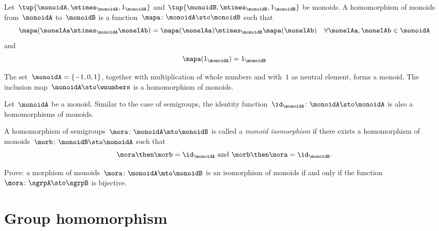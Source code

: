 \begin{definition}
  \label{def:monoid-mor}
  Let~$\tup{\monoidA, \mtimes_\monoidA, 1_\monoidA}$ and $\tup{\monoidB, \mtimes_\monoidB, 1_\monoidB}$ be monoids.
  A homomorphism of monoids from~$\monoidA$ to~$\monoidB$ is a function~$\mapa \colon \monoidA \sto \monoidB$ such that
  \begin{equation}
    \label{mon-mor-comp}
    \mapa (\monelAa \mtimes_{\monoidA} \monelAb) = \mapa (\monelAa) \mtimes_{\monoidB}  \mapa(\monelAb) \quad \forall \monelAa, \monelAb \in \monoidA
  \end{equation}
  and
  \begin{equation}
    \label{mon-id-comp}
    \mapa (1_\monoidA) = 1_{\monoidB}
  \end{equation}
\end{definition}

\begin{example}
  The set~$\monoidA = \{ -1, 0, 1 \}$, together with multiplication of whole numbers and with~$1$ as neutral element, forms a monoid. The inclusion map~$\monoidA \sto \wnumbers$ is a homomorphism of monoids.
\end{example}



\begin{definition}
  \label{def:identity-mon-mor}
  Let~$\monoidA$ be a monoid. Similar to the case of semigroups, the identity function~$\id_\monoidA\colon \monoidA \sto \monoidA$ is also a homomorphisms of monoids.
\end{definition}



\begin{definition}
  \label{def:monoid-iso}
  A homomorphism of semigroups~$\mora\colon \monoidA \mto \monoidB$ is called a \emph{monoid isomorphism} if there exists a homomorphism of monoids~$\morb\colon \monoidB \sto \monoidA$ such that
  \begin{equation}
    \mora \then \morb = \id_\monoidA \text{ and } \morb \then \mora = \id_\monoidB.
  \end{equation}
\end{definition}


\begin{exercise}
  Prove: a morphism of monoids~$\mora\colon \monoidA \mto \monoidB$ is an isomorphism of monoids if and only if the function~$\mora\colon \sgrpA \sto \sgrpB$ is bijective.
\end{exercise}
\begin{solution}
\end{solution}


\section{Group homomorphism}





